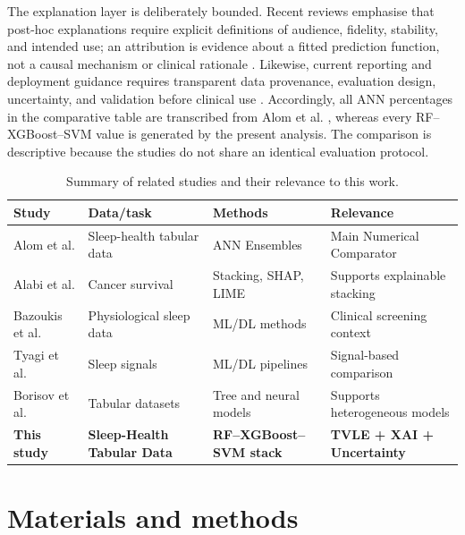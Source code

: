 \documentclass{elektr}
\begin{document}
The explanation layer is deliberately bounded. Recent reviews emphasise that post-hoc explanations require explicit definitions of audience, fidelity, stability, and intended use; an attribution is evidence about a fitted prediction function, not a causal mechanism or clinical rationale \cite{jung2023,allen2024}. Likewise, current reporting and deployment guidance requires transparent data provenance, evaluation design, uncertainty, and validation before clinical use \cite{tripodai2024,futureai2025}. Accordingly, all ANN percentages in the comparative table are transcribed from Alom et al. \cite{alom2024}, whereas every RF--XGBoost--SVM value is generated by the present analysis. The comparison is descriptive because the studies do not share an identical evaluation protocol.
\begin{table}[H]
\centering
\caption{Summary of related studies and their relevance to this work.}
\label{tab:related_work}
\small
\setlength{\tabcolsep}{4pt}
\renewcommand{\arraystretch}{1.05}
\begin{tabularx}{\textwidth}{@{}L{0.18\textwidth}L{0.22\textwidth}L{0.23\textwidth}Y@{}}
\toprule
Study & Data/task & Methods & Relevance \\
\midrule

Alom et al. \cite{alom2024} &
Sleep-health tabular data &
ANN Ensembles &
Main Numerical Comparator \\

Alabi et al. \cite{alabi2023} &
Cancer survival &
Stacking, SHAP, LIME &
Supports explainable stacking \\

Bazoukis et al. \cite{bazoukis2023} &
Physiological sleep data &
ML/DL methods &
Clinical screening context \\

Tyagi et al. \cite{tyagi2023} &
Sleep signals &
ML/DL pipelines &
Signal-based comparison \\

Borisov et al. \cite{borisov2024} &
Tabular datasets &
Tree and neural models &
Supports heterogeneous models \\

\textbf{This study} &
\textbf{Sleep-Health Tabular Data} &
\textbf{RF--XGBoost--SVM stack} &
\textbf{TVLE + XAI + Uncertainty} \\

\bottomrule
\end{tabularx}
\end{table}

\section{Materials and methods}
\end{document}
